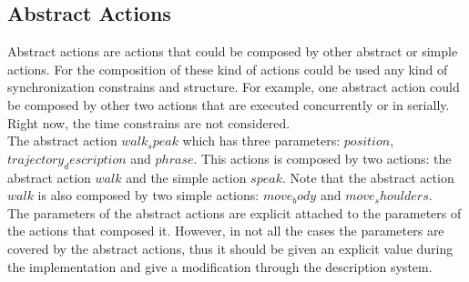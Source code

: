 \subsection{Abstract Actions}
Abstract actions are actions that could be composed by other abstract or simple actions. For the composition of these kind of actions could be used any kind of synchronization constrains and structure. For example, one abstract action could be composed by other two actions that are executed concurrently or in serially. Right now, the time constrains are not considered.\\
The abstract action $walk_speak$ which has three parameters: $position$, $trajectory_description$ and $phrase$. This actions is composed by two actions: the abstract action $walk$ and the simple action $speak$. Note that the abstract action $walk$ is also composed by two simple actions: $move_body$ and $move_shoulders$.\\
The parameters of the abstract actions are explicit attached to the parameters of the actions that composed it. However, in not all the cases the parameters are covered by the abstract actions, thus it should be given an explicit value during the implementation and give a modification through the description system.



